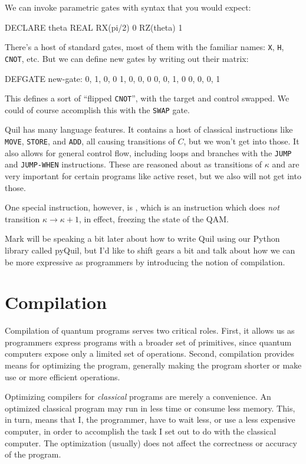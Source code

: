 We can invoke parametric gates with syntax that you would expect:
\begin{quil}
DECLARE theta REAL
RX(pi/2) 0
RZ(theta) 1
\end{quil}

There's a host of standard gates, most of them with the familiar names: \verb|X|, \verb|H|, \verb|CNOT|, etc. But we can define new gates by writing out their matrix:
\begin{quil}
DEFGATE new-gate:
    0, 1, 0, 0
    1, 0, 0, 0
    0, 0, 1, 0
    0, 0, 0, 1
\end{quil}
This defines a sort of ``flipped \verb|CNOT|'', with the target and control swapped. We could of course accomplish this with the \verb|SWAP| gate.

Quil has many language features. It contains a host of classical instructions like \verb|MOVE|, \verb|STORE|, and \verb|ADD|, all causing transitions of $C$, but we won't get into those. It also allows for general control flow, including loops and branches with the \verb|JUMP| and \verb|JUMP-WHEN| instructions. These are reasoned about as transitions of $\kappa$ and are very important for certain programs like active reset, but we also will not get into those.

One special instruction, however, is \Halt{}, which is an instruction which does \emph{not} transition $\kappa\to\kappa+1$, in effect, freezing the state of the QAM.

Mark will be speaking a bit later about how to write Quil using our Python library called pyQuil, but I'd like to shift gears a bit and talk about how we can be more expressive as programmers by introducing the notion of compilation.

\section{Compilation}

Compilation of quantum programs serves two critical roles. First, it allows us as programmers express programs with a broader set of primitives, since quantum computers expose only a limited set of operations. Second, compilation provides means for optimizing the program, generally making the program shorter or make use or more efficient operations.

Optimizing compilers for \emph{classical} programs are merely a convenience. An optimized classical program may run in less time or consume less memory. This, in turn, means that I, the programmer, have to wait less, or use a less expensive computer, in order to accomplish the task I set out to do with the classical computer. The optimization (usually) does not affect the correctness or accuracy of the program.

